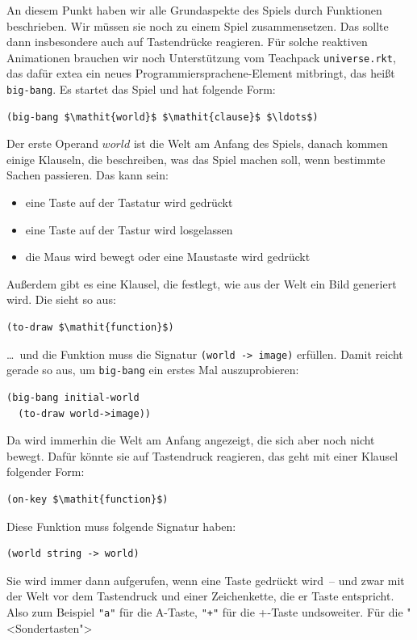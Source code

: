An diesem Punkt haben wir alle Grundaspekte des Spiels durch
Funktionen beschrieben.  Wir müssen sie noch zu einem Spiel
zusammensetzen.  Das sollte dann insbesondere auch auf Tastendrücke
reagieren.  Für solche reaktiven Animationen brauchen wir noch
Unterstützung vom Teachpack \texttt{universe.rkt}, das dafür extea ein
neues Programmiersprachene-Element mitbringt, das heißt
\lstinline{big-bang}.  Es startet
das Spiel und hat folgende Form:
%
\begin{lstlisting}
(big-bang $\mathit{world}$ $\mathit{clause}$ $\ldots$)
\end{lstlisting}
%
Der erste Operand $world$ ist die Welt am Anfang des Spiels, danach
kommen einige Klauseln, die beschreiben, was das Spiel machen soll,
wenn bestimmte Sachen passieren.  Das kann sein:
%
\begin{itemize}
\item eine Taste auf der Tastatur wird gedrückt
\item eine Taste auf der Tastur wird losgelassen
\item die Maus wird bewegt oder eine Maustaste wird gedrückt
\end{itemize}
%
Außerdem gibt es eine Klausel, die festlegt, wie aus der Welt ein Bild
generiert wird.  Die sieht so aus:
%
\begin{lstlisting}
(to-draw $\mathit{function}$)
\end{lstlisting}
%
\ldots~und die Funktion muss die Signatur \lstinline{(world -> image)}
erfüllen.  Damit reicht gerade so aus, um \lstinline{big-bang} ein
erstes Mal auszuprobieren:
%
\begin{lstlisting}
(big-bang initial-world
  (to-draw world->image))
\end{lstlisting}
%
Da wird immerhin die Welt am Anfang angezeigt, die sich aber noch
nicht bewegt.  Dafür könnte sie auf Tastendruck reagieren, das geht
mit einer Klausel folgender Form:
%
\begin{lstlisting}
(on-key $\mathit{function}$)
\end{lstlisting}
%
Diese Funktion muss folgende Signatur haben:
%
\begin{lstlisting}
(world string -> world)
\end{lstlisting}
%
Sie wird immer dann aufgerufen, wenn eine Taste gedrückt wird~-- und
zwar mit der Welt vor dem Tastendruck und einer Zeichenkette, die er
Taste entspricht.  Also zum Beispiel \lstinline{"a"} für die A-Taste,
\lstinline{"+"} für die +-Taste undsoweiter.  Für die "<Sondertasten">

